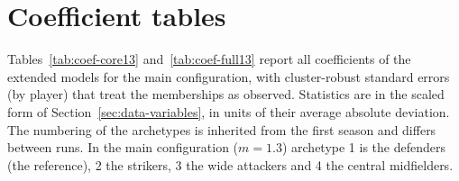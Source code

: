 \chapter{Coefficient tables}
\label{app:coef}

Tables~\ref{tab:coef-core13} and~\ref{tab:coef-full13} report all coefficients of the extended models for the main configuration, with cluster-robust standard errors (by player) that treat the memberships as observed. Statistics are in the scaled form of Section~\ref{sec:data-variables}, in units of their average absolute deviation. The numbering of the archetypes is inherited from the first season and differs between runs. In the main configuration ($m=1.3$) archetype 1 is the defenders (the reference), 2 the strikers, 3 the wide attackers and 4 the central midfielders.

\begin{table}[ht]
	\centering
	\footnotesize
	\caption{Core baseline with membership changes, $m=1.3$ (main configuration)}
	\label{tab:coef-core13}
	
\end{table}

\begin{table}[ht]
	\centering
	\scriptsize
	\caption{Full baseline with membership changes, $m=1.3$ (main configuration)}
	\label{tab:coef-full13}
	
\end{table}

